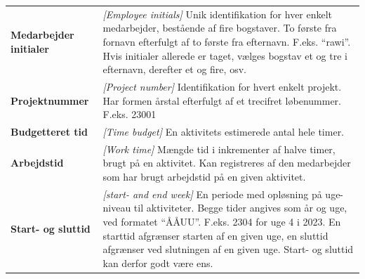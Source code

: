 \begin{table}[H]
\begin{tabular}{>{\bfseries}l p{}}
        Medarbejder initialer & \textit{[Employee initials]} Unik identifikation for hver enkelt medarbejder, bestående af fire bogstaver. To første fra fornavn efterfulgt af to første fra efternavn. F.eks. ``rawi''. Hvis initialer allerede er taget, vælges bogstav et og tre i efternavn, derefter et og fire, osv.                                     \\
        Projektnummer         & \textit{[Project number]} Identifikation for hvert enkelt projekt. Har formen årstal efterfulgt af et trecifret løbenummer. F.eks. 23001                                                                                                                                                                                      \\
        Budgetteret tid       & \textit{[Time budget]} En aktivitets estimerede antal hele timer.                                                                                                                                                                                                                                                              \\
        Arbejdstid            & \textit{[Work time]} Mængde tid i inkrementer af halve timer, brugt på en aktivitet. Kan registreres af den medarbejder som har brugt arbejdstid på en given aktivitet.                                                                                                                                                        \\
        Start- og sluttid     & \textit{[start- and end week]} En periode med opløsning på uge-niveau til aktiviteter. Begge tider angives som år og uge, ved formatet ``ÅÅUU''. F.eks. 2304 for uge 4 i 2023. En starttid afgrænser starten af en given uge, en sluttid afgrænser ved slutningen af en given uge. Start- og sluttid kan derfor godt være ens.
    \end{tabular}
\end{table}\newpage
